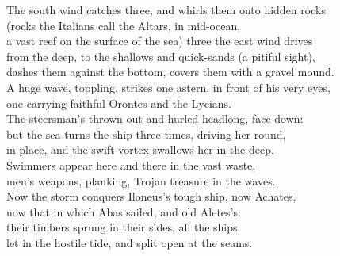 \documentclass[12pt, a5paper]{letter}
\begin{document}
The south wind catches three, and whirls them onto hidden rocks\\
(rocks the Italians call the Altars, in mid-ocean,\\
a vast reef on the surface of the sea) three the east wind drives\\
from the deep, to the shallows and quick-sands (a pitiful sight),\\
dashes them against the bottom, covers them with a gravel mound.\\
A huge wave, toppling, strikes one astern, in front of his very eyes,\\
one carrying faithful Orontes and the Lycians.\\
The steersman's thrown out and hurled headlong, face down:\\
but the sea turns the ship three times, driving her round,\\
in place, and the swift vortex swallows her in the deep.\\
Swimmers appear here and there in the vast waste,\\
men's weapons, planking, Trojan treasure in the waves.\\
Now the storm conquers Iloneus's tough ship, now Achates,\\
now that in which Abas sailed, and old Aletes's:\\
their timbers sprung in their sides, all the ships\\
let in the hostile tide, and split open at the seams.
\end{document}
